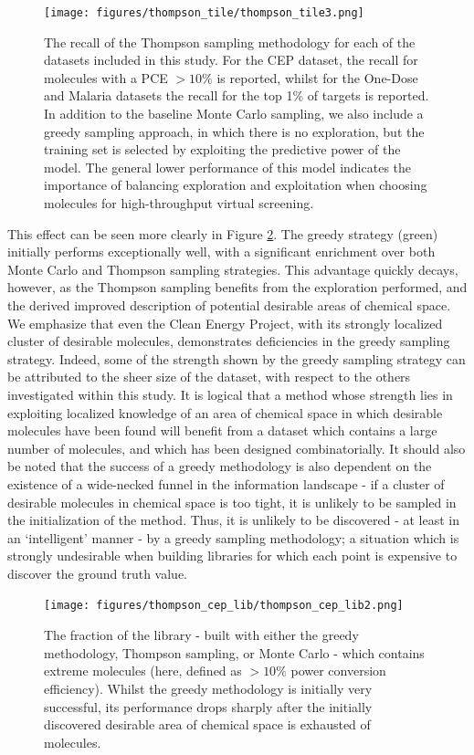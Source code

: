 \documentclass{pnastwo}
\begin{document}
\begin{article}
\begin{figure}[htb]
\begin{center}
\texttt{[image: figures/thompson\_tile/thompson\_tile3.png]}
\label{fig:thompson_1pc}
\caption{The recall of the Thompson sampling methodology for each of the datasets included in this study.  For the CEP dataset, the recall for molecules with a PCE $>10\%$ is reported, whilst for the One-Dose and Malaria datasets the recall for the top 1\% of targets is reported.  In addition to the baseline Monte Carlo sampling, we also include a greedy sampling approach, in which there is no exploration, but the training set is selected by exploiting the predictive power of the model.  The general lower performance of this model indicates the importance of balancing exploration and exploitation when choosing molecules for high-throughput virtual screening.}
\end{center}
\end{figure}
This effect can be seen more clearly in Figure \ref{fig:cep_lib}.  The greedy strategy (green) initially performs exceptionally well, with a significant enrichment over both Monte Carlo and Thompson sampling strategies.  This advantage quickly decays, however, as the Thompson sampling benefits from the exploration performed, and the derived improved description of potential desirable areas of chemical space. We emphasize that even the Clean Energy Project, with its strongly localized cluster of desirable molecules, demonstrates deficiencies in the greedy sampling strategy.  Indeed, some of the strength shown by the greedy sampling strategy can be attributed to the sheer size of the dataset, with respect to the others investigated within this study.  It is logical that a method whose strength lies in exploiting localized knowledge of an area of chemical space in which desirable molecules have been found will benefit from a dataset which contains a large number of molecules, and which has been designed combinatorially. It should also be noted that the success of a greedy methodology is also dependent on the existence of a wide-necked funnel in the information landscape - if a cluster of desirable molecules in chemical space is too tight, it is unlikely to be sampled in the initialization of the method.  Thus, it is unlikely to be discovered - at least in an `intelligent' manner - by a greedy sampling methodology; a situation which is strongly undesirable when building libraries for which each point is expensive to discover the ground truth value.
  

\begin{figure}[htb]
\begin{center}
\texttt{[image: figures/thompson\_cep\_lib/thompson\_cep\_lib2.png]}
\label{fig:cep_lib}
\caption{The fraction of the library - built with either the greedy methodology, Thompson sampling, or Monte Carlo - which contains extreme molecules (here, defined as $> 10\%$ power conversion efficiency).  Whilst the greedy methodology is initially very successful, its performance drops sharply after the initially discovered desirable area of chemical space is exhausted of molecules.}
\end{center}
\end{figure}


\end{article}
\end{document}
